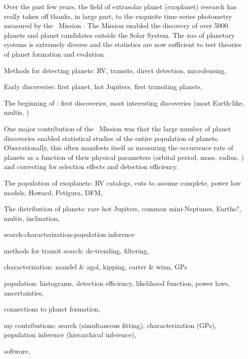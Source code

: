 Over the past few years, the field of extrasolar planet (exoplanet) research
has really taken off thanks, in large part, to the exquisite time series
photometry measured by the \kepler\ Mission .
The Mission enabled the discovery of over 5000  planets and planet
candidates outside the Solar System.
The zoo of planetary systems is extremely diverse and the statistics are now
sufficient to test theories of planet formation and evolution .

{Methods for detecting planets: RV, transits, direct detection,
microlensing, \etc}

{Early discoveries: first planet, hot Jupiters, first transiting
planets, \etc}

{The beginning of \kepler: first discoveries, most interesting
discoveries (most Earth-like, multis, \etc)}

One major contribution of the \kepler\ Mission was that the large number of
planet discoveries enabled statistical studies of the entire population of
planets.
Obserationally, this often manifests itself as measuring the occurrence rate
of planets as a function of their physical parameters (orbital period, mass,
radius, \etc) and correcting for selection effects and detection efficiency.



{The population of exoplanets: RV catalogs, cuts to assume complete,
power law models, Howard, Petigura, DFM, \etc}

{The distribution of planets: rare hot Jupiters, common mini-Neptunes,
Earths?, multis, inclination, \etc}

{search-characterization-population inference}

{methods for transit search: de-trending, filtering, \etc}

{characterization: mandel \& agol, kipping, carter \& winn, GPs}

{population: histograms, detection efficiency, likelihood function,
power laws, uncertainties, \etc}

{connections to planet formation, \etc}

{my contributions: search (simultaneous fitting), characterization
(GPs), population inference (hierarchical inference), \etc}

{software, \etc}




